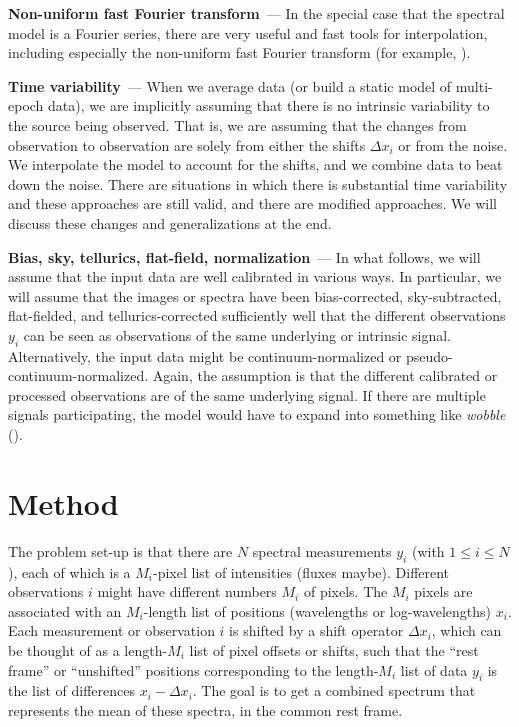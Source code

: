 \documentclass[modern]{aastex631}
\renewcommand{\paragraph}[1]{\medskip\par\noindent\textbf{#1}~---}
\begin{document}
\paragraph{Non-uniform fast Fourier transform}
In the special case that the spectral model is a Fourier series, there are very useful and fast tools for interpolation, including especially the non-uniform fast Fourier transform (for example, \citealt{finufft}).

\paragraph{Time variability}
When we average data (or build a static model of multi-epoch data), we are implicitly assuming that there is no intrinsic variability to the source being observed.
That is, we are assuming that the changes from observation to observation are solely from either the shifts $\Delta x_i$ or from the noise.
We interpolate the model to account for the shifts, and we combine data to beat down the noise.
There are situations in which there is substantial time variability and these approaches are still valid, and there are modified approaches.
We will discuss these changes and generalizations at the end.

\paragraph{Bias, sky, tellurics, flat-field, normalization}
In what follows, we will assume that the input data are well calibrated in various ways.
In particular, we will assume that the images or spectra have been bias-corrected, sky-subtracted, flat-fielded, and tellurics-corrected sufficiently well that the different observations $y_i$ can be seen as observations of the same underlying or intrinsic signal.
Alternatively, the input data might be continuum-normalized or pseudo-continuum-normalized.
Again, the assumption is that the different calibrated or processed observations are of the same underlying signal.
If there are multiple signals participating, the model would have to expand into something like \textsl{wobble} (\citealt{wobble}).

\section{Method}\label{sec:method}

The problem set-up is that there are $N$ spectral measurements $y_i$ (with $1\leq i\leq N$), each of which is a $M_i$-pixel list of intensities (fluxes maybe).
Different observations $i$ might have different numbers $M_i$ of pixels.
The $M_i$ pixels are associated with an $M_i$-length list of positions (wavelengths or log-wavelengths) $x_i$.
Each measurement or observation $i$ is shifted by a shift operator $\Delta x_i$, which can be thought of as a length-$M_i$ list of pixel offsets or shifts, such that the ``rest frame'' or ``unshifted'' positions corresponding to the length-$M_i$ list of data $y_i$ is the list of differences $x_i - \Delta x_i$.
The goal is to get a combined spectrum that represents the mean of these spectra, in the common rest frame.
\end{document}
